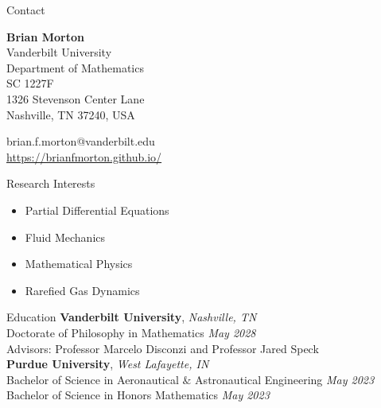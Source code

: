 \documentclass{CV} %
\begin{document}

\begin{rSection}{Contact}
\begin{multicols}{2}
    \textbf{Brian Morton} \\
    Vanderbilt University \\
    Department of Mathematics \\
    SC 1227F \\
    1326 Stevenson Center Lane \\
    Nashville, TN 37240, USA\\ 
    \columnbreak

    brian.f.morton@vanderbilt.edu \\
    \href{https://brianfmorton.github.io/}{https://brianfmorton.github.io/}
\end{multicols}
\vspace{-15pt} %
\end{rSection}


\begin{rSection}{Research Interests}
\begin{itemize}
    \item Partial Differential Equations 
    \item Fluid Mechanics 
    \item Mathematical Physics
    \item Rarefied Gas Dynamics
\end{itemize}
\end{rSection}


\begin{rSection}{Education}
    \textbf{Vanderbilt University}, \textit{Nashville, TN} \\ 
    Doctorate of Philosophy in Mathematics \hfill \textit{May 2028}\\
    Advisors: Professor Marcelo Disconzi and Professor Jared Speck \\
    \newline
    \textbf{Purdue University}, \textit{West Lafayette, IN} \\
     Bachelor of Science in Aeronautical $\&$ Astronautical Engineering \hfill \textit{May 2023}\\
     Bachelor of Science in Honors Mathematics \hfill \textit{May 2023} \\ 
    
\end{rSection}
\end{document}
